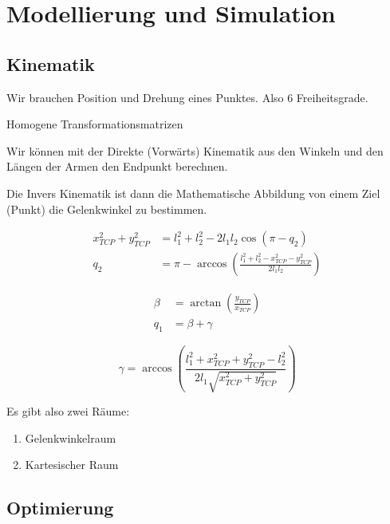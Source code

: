 \documentclass[a4paper]{article}
\title{\docTitle}
\author{Moritz}
\date{\today}
\begin{document}
\maketitle
\tableofcontents


\section{Modellierung und Simulation}

\subsection{Kinematik}

Wir brauchen Position und Drehung eines Punktes. Also 6 Freiheitsgrade.

Homogene Transformationsmatrizen

Wir können mit der Direkte (Vorwärts) Kinematik aus den Winkeln und den Längen der Armen den Endpunkt berechnen.

Die Invers Kinematik ist dann die Mathematische Abbildung von einem Ziel (Punkt) die Gelenkwinkel zu bestimmen.


\begin{align*}
    x^2_{TCP} + y^2_{TCP} &= l_1^2+l_2^2 - 2 l_1l_2\cos(\pi - q_2)\\
    q_2 &= \pi - \arccos\left(\frac{l_1^2+l_2^2-x_{TCP}^2-y_{TCP}^2}{2l_1l_2}\right)
\end{align*}

\begin{align*}
    \beta &= \arctan\left(\frac{y_{TCP}}{x_{TCP}}\right)\\
    q_1 &= \beta + \gamma
\end{align*}

$$\gamma = \arccos\left(\frac{l_1^2+x_{TCP}^2+y_{TCP}^2-l_2^2}{2l_1\sqrt{x_{TCP}^2+y_{TCP}^2}}\right)$$

Es gibt also zwei Räume:

\begin{enumerate}
    \item Gelenkwinkelraum
    \item Kartesischer Raum
\end{enumerate}

\subsection{Optimierung}
\end{document}
